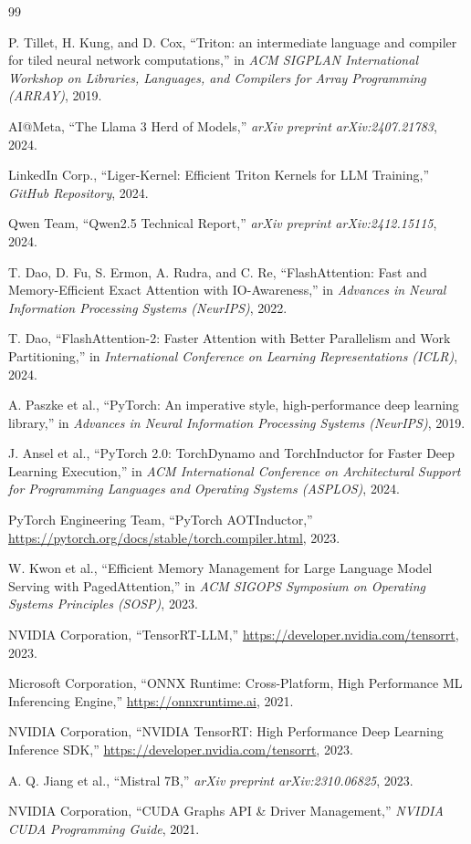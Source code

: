 \documentclass[11pt,a4paper]{article}
\begin{document}
\begin{thebibliography}{99}

P. Tillet, H. Kung, and D. Cox, ``Triton: an intermediate language and compiler for tiled neural network computations,'' in \textit{ACM SIGPLAN International Workshop on Libraries, Languages, and Compilers for Array Programming (ARRAY)}, 2019.

AI@Meta, ``The Llama 3 Herd of Models,'' \textit{arXiv preprint arXiv:2407.21783}, 2024.

LinkedIn Corp., ``Liger-Kernel: Efficient Triton Kernels for LLM Training,'' \textit{GitHub Repository}, 2024.

Qwen Team, ``Qwen2.5 Technical Report,'' \textit{arXiv preprint arXiv:2412.15115}, 2024.

T. Dao, D. Fu, S. Ermon, A. Rudra, and C. Re, ``FlashAttention: Fast and Memory-Efficient Exact Attention with IO-Awareness,'' in \textit{Advances in Neural Information Processing Systems (NeurIPS)}, 2022.

T. Dao, ``FlashAttention-2: Faster Attention with Better Parallelism and Work Partitioning,'' in \textit{International Conference on Learning Representations (ICLR)}, 2024.

A. Paszke et al., ``PyTorch: An imperative style, high-performance deep learning library,'' in \textit{Advances in Neural Information Processing Systems (NeurIPS)}, 2019.

J. Ansel et al., ``PyTorch 2.0: TorchDynamo and TorchInductor for Faster Deep Learning Execution,'' in \textit{ACM International Conference on Architectural Support for Programming Languages and Operating Systems (ASPLOS)}, 2024.

PyTorch Engineering Team, ``PyTorch AOTInductor,'' \url{https://pytorch.org/docs/stable/torch.compiler.html}, 2023.

W. Kwon et al., ``Efficient Memory Management for Large Language Model Serving with PagedAttention,'' in \textit{ACM SIGOPS Symposium on Operating Systems Principles (SOSP)}, 2023.

NVIDIA Corporation, ``TensorRT-LLM,'' \url{https://developer.nvidia.com/tensorrt}, 2023.

Microsoft Corporation, ``ONNX Runtime: Cross-Platform, High Performance ML Inferencing Engine,'' \url{https://onnxruntime.ai}, 2021.

NVIDIA Corporation, ``NVIDIA TensorRT: High Performance Deep Learning Inference SDK,'' \url{https://developer.nvidia.com/tensorrt}, 2023.

A. Q. Jiang et al., ``Mistral 7B,'' \textit{arXiv preprint arXiv:2310.06825}, 2023.

NVIDIA Corporation, ``CUDA Graphs API \& Driver Management,'' \textit{NVIDIA CUDA Programming Guide}, 2021.

\end{thebibliography}
\end{document}
